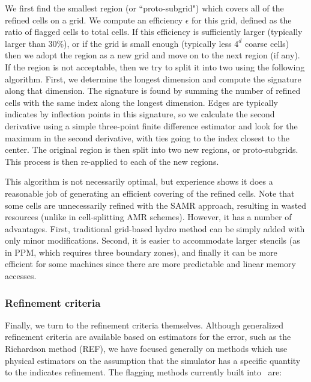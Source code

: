 We first find the smallest region (or ``proto-subgrid") which covers all of the refined cells on a grid.  We compute an efficiency $\epsilon$ for this grid, defined as the ratio of flagged cells to total cells.  If this efficiency is sufficiently larger (typically larger than 30\%), or if the grid is small enough (typically less $4^d$ coarse cells) then we adopt the region as a new grid and move on to the next region (if any).  If the region is not acceptable, then we try to split it into two using the following algorithm.  First, we determine the longest dimension and compute the signature along that dimension.  The signature is found by summing the number of refined cells with the same index along the longest dimension.  Edges are typically indicates by inflection points in this signature, so we calculate the second derivative using a simple three-point finite difference estimator and look for the maximum in the second derivative, with ties going to the index closest to the center.  The original region is then split into two new regions, or proto-subgrids.  This process is then re-applied to each of the new regions.

This algorithm is not necessarily optimal, but experience shows it does a reasonable job of generating an efficient covering of the refined cells.  Note that some cells are unnecessarily refined with the SAMR approach, resulting in wasted resources (unlike in cell-splitting AMR schemes).  However, it has a number of advantages.  First, traditional grid-based hydro method can be simply added with only minor modifications.  Second, it is easier to accommodate larger stencils (as in PPM, which requires three boundary zones), and finally it can be more efficient for some machines since there are more predictable and linear memory accesses.


\subsubsection{Refinement criteria}
\label{sec:refinement_criteria}

Finally, we turn to the refinement criteria themselves.  Although generalized refinement criteria are available based on estimators for the error, such as the Richardson method (REF), we have focused generally on methods which use physical estimators on the assumption that the simulator has a specific quantity to the indicates refinement.  The flagging methods currently built into \enzo\ are:

